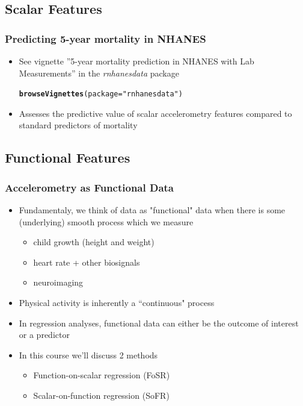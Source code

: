 \documentclass[10pt]{beamer}\usepackage[]{graphicx}\usepackage[]{color}
\makeatletter
\newcommand{\hlstr}[1]{\textcolor[rgb]{0.192,0.494,0.8}{#1}}%
\newcommand{\hlstd}[1]{\textcolor[rgb]{0.345,0.345,0.345}{#1}}%
\newcommand{\hlkwc}[1]{\textcolor[rgb]{0.333,0.667,0.333}{#1}}%
\newcommand{\hlkwd}[1]{\textcolor[rgb]{0.737,0.353,0.396}{\textbf{#1}}}%
\newenvironment{kframe}{%
 \def\at@end@of@kframe{}%
 \ifinner\ifhmode%
  \def\at@end@of@kframe{\end{minipage}}%
  \begin{minipage}{\columnwidth}%
 \fi\fi%
 \def\FrameCommand##1{\hskip\@totalleftmargin \hskip-\fboxsep
 \colorbox{shadecolor}{##1}\hskip-\fboxsep
     \hskip-\linewidth \hskip-\@totalleftmargin \hskip\columnwidth}%
 \MakeFramed {\advance\hsize-\width
   \@totalleftmargin\z@ \linewidth\hsize
   \@setminipage}}%
 {\par\unskip\endMakeFramed%
 \at@end@of@kframe}
\newenvironment{knitrout}{}{} %
\makeatother
\begin{document}
\subsection{Scalar Features}


\begin{frame}[fragile]
\frametitle{Predicting 5-year mortality in NHANES}
\begin{itemize}
\item See vignette ''5-year mortality prediction in NHANES with Lab Measurements''  in the {\it rnhanesdata} package

\begin{knitrout}\small
{}\color{fgcolor}\begin{kframe}
\begin{alltt}
\hlkwd{browseVignettes}\hlstd{(}\hlkwc{package}\hlstd{=}\hlstr{"rnhanesdata"}\hlstd{)}
\end{alltt}
\end{kframe}
\end{knitrout}
\item Assesses the predictive value of scalar accelerometry features compared to standard predictors of mortality
\end{itemize}
\end{frame}




\subsection{Functional Features}



\begin{frame}
\frametitle{Accelerometry as Functional Data}
\begin{itemize}
\item Fundamentaly, we think of data as "functional" data when there is some (underlying) smooth 
process which we measure
    \begin{itemize}
    \item child growth (height and weight)
    \item heart rate + other biosignals
    \item neuroimaging 
    \end{itemize}
\item Physical activity is inherently a ``continuous" process 
\item In regression analyses, functional data can either be the outcome of interest or a predictor
\item In this course we'll discuss 2 methods
    \begin{itemize}
    \item Function-on-scalar regression (FoSR)
    \item Scalar-on-function regression (SoFR)
    \end{itemize}
\end{itemize}
\end{frame}
\end{document}
